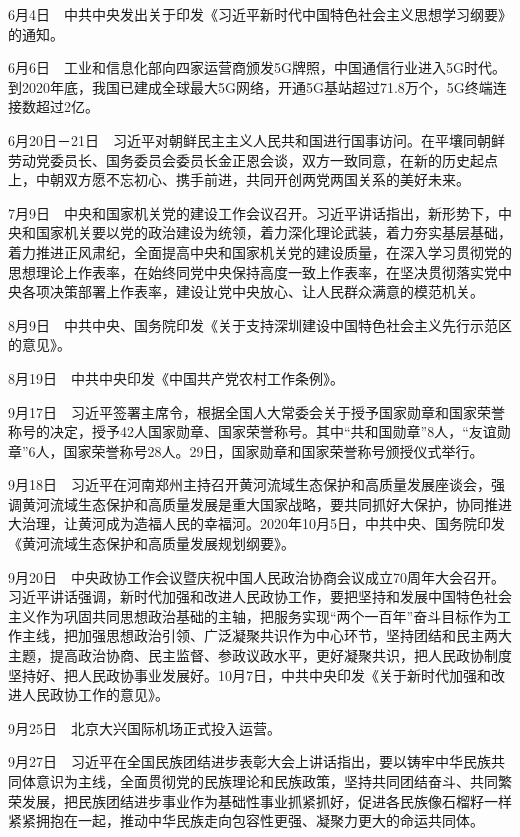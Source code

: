 \documentclass[10pt,a4paper,twocolumn]{book}
\begin{document}
6月4日　中共中央发出关于印发《习近平新时代中国特色社会主义思想学习纲要》的通知。

6月6日　工业和信息化部向四家运营商颁发5G牌照，中国通信行业进入5G时代。到2020年底，我国已建成全球最大5G网络，开通5G基站超过71.8万个，5G终端连接数超过2亿。

6月20日－21日　习近平对朝鲜民主主义人民共和国进行国事访问。在平壤同朝鲜劳动党委员长、国务委员会委员长金正恩会谈，双方一致同意，在新的历史起点上，中朝双方愿不忘初心、携手前进，共同开创两党两国关系的美好未来。

7月9日　中央和国家机关党的建设工作会议召开。习近平讲话指出，新形势下，中央和国家机关要以党的政治建设为统领，着力深化理论武装，着力夯实基层基础，着力推进正风肃纪，全面提高中央和国家机关党的建设质量，在深入学习贯彻党的思想理论上作表率，在始终同党中央保持高度一致上作表率，在坚决贯彻落实党中央各项决策部署上作表率，建设让党中央放心、让人民群众满意的模范机关。

8月9日　中共中央、国务院印发《关于支持深圳建设中国特色社会主义先行示范区的意见》。

8月19日　中共中央印发《中国共产党农村工作条例》。

9月17日　习近平签署主席令，根据全国人大常委会关于授予国家勋章和国家荣誉称号的决定，授予42人国家勋章、国家荣誉称号。其中“共和国勋章”8人，“友谊勋章”6人，国家荣誉称号28人。29日，国家勋章和国家荣誉称号颁授仪式举行。

9月18日　习近平在河南郑州主持召开黄河流域生态保护和高质量发展座谈会，强调黄河流域生态保护和高质量发展是重大国家战略，要共同抓好大保护，协同推进大治理，让黄河成为造福人民的幸福河。2020年10月5日，中共中央、国务院印发《黄河流域生态保护和高质量发展规划纲要》。

9月20日　中央政协工作会议暨庆祝中国人民政治协商会议成立70周年大会召开。习近平讲话强调，新时代加强和改进人民政协工作，要把坚持和发展中国特色社会主义作为巩固共同思想政治基础的主轴，把服务实现“两个一百年”奋斗目标作为工作主线，把加强思想政治引领、广泛凝聚共识作为中心环节，坚持团结和民主两大主题，提高政治协商、民主监督、参政议政水平，更好凝聚共识，把人民政协制度坚持好、把人民政协事业发展好。10月7日，中共中央印发《关于新时代加强和改进人民政协工作的意见》。

9月25日　北京大兴国际机场正式投入运营。

9月27日　习近平在全国民族团结进步表彰大会上讲话指出，要以铸牢中华民族共同体意识为主线，全面贯彻党的民族理论和民族政策，坚持共同团结奋斗、共同繁荣发展，把民族团结进步事业作为基础性事业抓紧抓好，促进各民族像石榴籽一样紧紧拥抱在一起，推动中华民族走向包容性更强、凝聚力更大的命运共同体。
\end{document}
